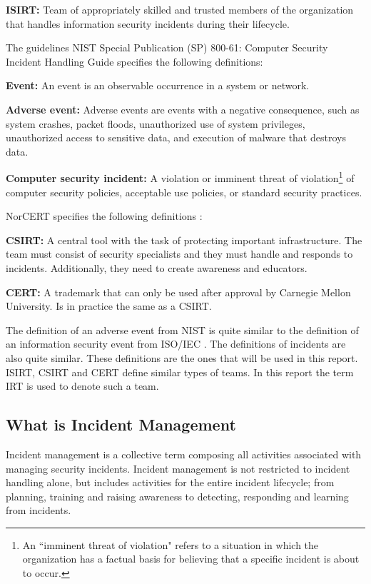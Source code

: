 \textbf{\ac{ISIRT}:} Team of appropriately skilled and trusted members of the organization that handles information security incidents during their lifecycle.

The guidelines \acs{NIST} Special Publication (SP) 800-61: Computer Security Incident Handling
Guide \cite{nist800-61} specifies the following definitions:

\textbf{Event:} An event is an observable occurrence in a system or network.

\textbf{Adverse event:} Adverse events are events with a negative consequence, such as system crashes, packet floods, unauthorized use of system privileges, unauthorized access to sensitive data, and execution of malware that destroys data.

\textbf{Computer security incident:} A violation or imminent threat of violation\footnote{An ``imminent threat of violation" refers to a situation in which the organization has a factual basis for believing that a specific incident is about to occur.} of computer security policies, acceptable use policies, or standard security practices.

\acs{NorCERT} specifies the following definitions \cite{NorCERT3Kvartal2012}:

\textbf{\ac{CSIRT}:} A central tool with the task of protecting important infrastructure. The team must consist of security specialists and they must handle and responds to incidents. Additionally, they need to create awareness and educators.

\textbf{\ac{CERT}:} A trademark that can only be used after approval by Carnegie Mellon University. Is in practice the same as a \acs{CSIRT}.

The definition of an adverse event from \acs{NIST} \cite{nist800-61} is quite similar to the definition of an information security event from ISO/IEC \cite{ISO/IEC27000}. The definitions of incidents are also quite similar. These definitions are the ones that will be used in this report. \ac{ISIRT}, \ac{CSIRT} and \ac{CERT} define similar types of teams. In this report the term \acs{IRT} is used to denote such a team. 

\subsection{What is Incident Management}
Incident management is a collective term composing all activities associated with managing security incidents. Incident management is not restricted to incident handling alone, but includes activities for the entire incident lifecycle; from planning, training and raising awareness to detecting, responding and learning from incidents. 

